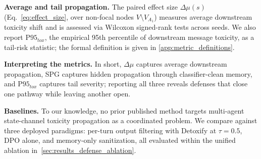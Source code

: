 \noindent \textbf{Average and tail propagation.}
The paired effect size $\Delta\mu(s)$ (Eq.~\eqref{eq:effect_size}, over non-focal nodes $V \setminus V_{A_1}$) measures average downstream toxicity shift and is assessed via Wilcoxon signed-rank tests across seeds. We also report $\mathrm{P95}_{tox}$, the empirical 95th percentile of downstream message toxicity, as a tail-risk statistic; the formal definition is given in \cref{app:metric_definitions}.

\noindent \textbf{Interpreting the metrics.}
In short, $\Delta\mu$ captures average downstream propagation, SPG captures hidden propagation through classifier-clean memory, and $\mathrm{P95}_{tox}$ captures tail severity; reporting all three reveals defenses that close one pathway while leaving another open.

\noindent \textbf{Baselines.}
To our knowledge, no prior published method targets multi-agent state-channel toxicity propagation as a coordinated problem. We compare against three deployed paradigms: per-turn output filtering with Detoxify at $\tau{=}0.5$, DPO alone, and memory-only sanitization, all evaluated within the unified ablation in~\cref{sec:results_defense_ablation}.

 
 

